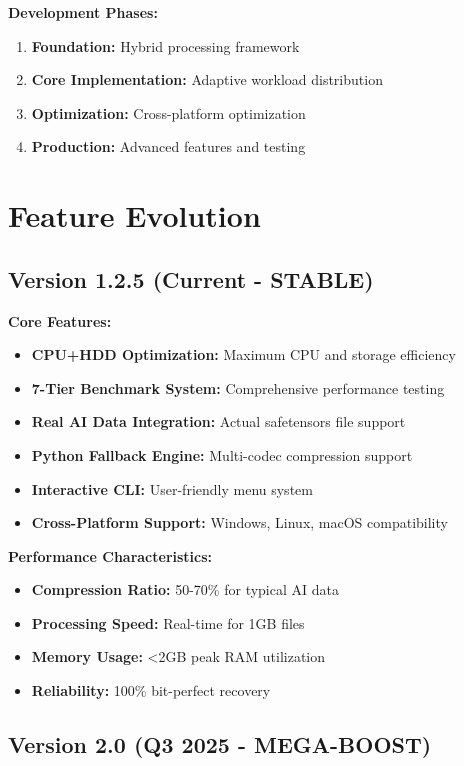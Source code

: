 \documentclass[12pt,a4paper]{article}
\begin{document}
\textbf{Development Phases:}
\begin{enumerate}
    \item \textbf{Foundation:} Hybrid processing framework
    \item \textbf{Core Implementation:} Adaptive workload distribution
    \item \textbf{Optimization:} Cross-platform optimization
    \item \textbf{Production:} Advanced features and testing
\end{enumerate}

\section{Feature Evolution}

\subsection{Version 1.2.5 (Current - STABLE)}

\textbf{Core Features:}
\begin{itemize}
    \item \textbf{CPU+HDD Optimization:} Maximum CPU and storage efficiency
    \item \textbf{7-Tier Benchmark System:} Comprehensive performance testing
    \item \textbf{Real AI Data Integration:} Actual safetensors file support
    \item \textbf{Python Fallback Engine:} Multi-codec compression support
    \item \textbf{Interactive CLI:} User-friendly menu system
    \item \textbf{Cross-Platform Support:} Windows, Linux, macOS compatibility
\end{itemize}

\textbf{Performance Characteristics:}
\begin{itemize}
    \item \textbf{Compression Ratio:} 50-70\% for typical AI data
    \item \textbf{Processing Speed:} Real-time for 1GB files
    \item \textbf{Memory Usage:} <2GB peak RAM utilization
    \item \textbf{Reliability:} 100\% bit-perfect recovery
\end{itemize}

\subsection{Version 2.0 (Q3 2025 - MEGA-BOOST)}
\end{document}
